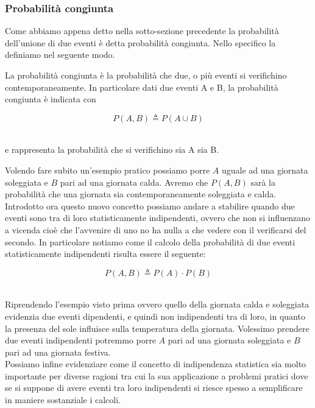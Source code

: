 \documentclass[../main.tex]{subfiles}
\begin{document}
\subsubsection{Probabilità congiunta}

Come abbiamo appena detto nella sotto-sezione precedente la probabilità dell'unione di due eventi è detta probabilità congiunta. Nello specifico la definiamo nel seguente modo.

\begin{definition*}

La probabilità congiunta è la probabilità che due, o più eventi si verifichino contemporaneamente. In particolare dati due eventi A e B, la probabilità congiunta è indicata con 

\[P(A,B) \triangleq P(A \cup B)\]\

e rappresenta la probabilità che si verifichino sia A sia B.

\end{definition*}

Volendo fare subito un'esempio pratico possiamo porre $A$ uguale ad una giornata soleggiata e $B$ pari ad una giornata calda. Avremo che $P(A,B)$ sarà la probabilità che una giornata sia contemporaneamente soleggiata e calda.\\

Introdotto ora questo nuovo concetto possiamo andare a stabilire quando due eventi sono tra di loro statisticamente indipendenti, ovvero che non si influenzano a vicenda cioè che l'avvenire di uno no ha nulla a che vedere con il verificarsi del secondo. In particolare notiamo come il calcolo della probabilità di due eventi statisticamente indipendenti risulta essere il seguente:

\[P(A,B) \triangleq P(A) \cdot P(B) \]\

Riprendendo l'esempio visto prima ovvero quello della giornata calda e soleggiata evidenzia due eventi dipendenti, e quindi non indipendenti tra di loro, in quanto la presenza del sole influisce sulla temperatura della giornata. Volessimo prendere due eventi indipendenti potremmo porre $A$ pari ad una giornata soleggiata e $B$ pari ad una giornata festiva.\\

Possiamo infine evidenziare come il concetto di indipendenza statistica sia molto importante per diverse ragioni tra cui la sua applicazione a problemi pratici dove se si suppone di avere eventi tra loro indipendenti si riesce spesso a semplificare in maniere sostanziale i calcoli.
\end{document}
